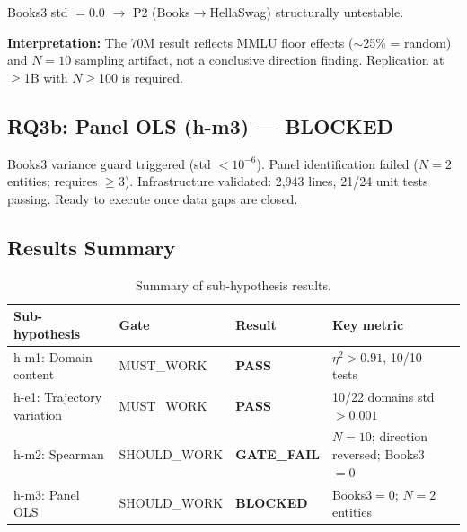 Books3 std $= 0.0$ $\to$ P2 (Books$\to$HellaSwag) structurally untestable.

\textbf{Interpretation:} The 70M result reflects MMLU floor effects ($\sim$25\% = random) and $N=10$ sampling artifact, not a conclusive direction finding. Replication at $\geq$1B with $N\geq$100 is required.

\subsection{RQ3b: Panel OLS (h-m3) --- BLOCKED}

Books3 variance guard triggered (std $< 10^{-6}$). Panel identification failed ($N=2$ entities; requires $\geq$3). Infrastructure validated: 2,943 lines, 21/24 unit tests passing. Ready to execute once data gaps are closed.

\subsection{Results Summary}

\begin{table}[h]
\centering
\caption{Summary of sub-hypothesis results.}
\label{tab:summary}
\begin{tabular}{lllll}
\toprule
\textbf{Sub-hypothesis} & \textbf{Gate} & \textbf{Result} & \textbf{Key metric} \\
\midrule
h-m1: Domain content & MUST\_WORK & \textbf{PASS} & $\eta^2 > 0.91$, 10/10 tests \\
h-e1: Trajectory variation & MUST\_WORK & \textbf{PASS} & 10/22 domains std $> 0.001$ \\
h-m2: Spearman & SHOULD\_WORK & \textbf{GATE\_FAIL} & $N=10$; direction reversed; Books3$=0$ \\
h-m3: Panel OLS & SHOULD\_WORK & \textbf{BLOCKED} & Books3$=0$; $N=2$ entities \\
\bottomrule
\end{tabular}
\end{table}
